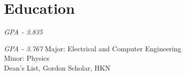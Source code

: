 \section{Education}
{\textit{GPA - 3.835}}
{}

{\textit{GPA - 3.767}}
{ Major: Electrical and Computer Engineering \\
  Minor: Physics \\
  Dean's List, Gordon Scholar, HKN}
